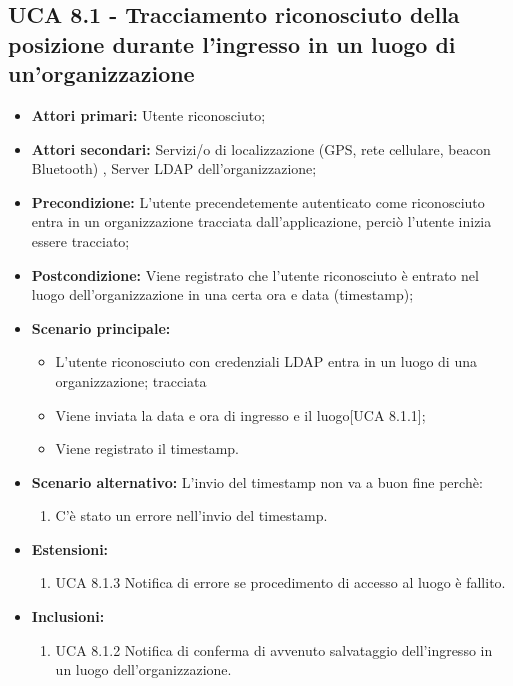\subsection{UCA 8.1 - Tracciamento riconosciuto della posizione durante l'ingresso in un luogo di un'organizzazione}%
\begin{itemize}
\item \textbf{Attori primari:} Utente riconosciuto;
\item \textbf{Attori secondari:} Servizi/o di localizzazione (GPS, rete cellulare, beacon Bluetooth) , Server LDAP dell'organizzazione;
\item \textbf{Precondizione:} L'utente precendetemente autenticato come riconosciuto entra in un organizzazione tracciata dall'applicazione, perciò l'utente inizia essere tracciato;
\item \textbf{Postcondizione:} Viene registrato che l'utente riconosciuto è entrato nel luogo dell'organizzazione in una certa ora e data (timestamp);
\item \textbf{Scenario principale:}
	\begin{itemize}
	\item L'utente riconosciuto con credenziali LDAP entra in un luogo di una organizzazione; tracciata
	\item Viene inviata la data e ora di ingresso e il luogo[UCA 8.1.1];
	\item Viene registrato il timestamp.
\end{itemize}
\item \textbf{Scenario alternativo:} L'invio del timestamp non va a buon fine perchè:
\begin{enumerate}
	\item C'è stato un errore nell'invio del timestamp.
\end{enumerate}
\item \textbf{Estensioni:}
	\begin{enumerate}
		\item UCA 8.1.3 Notifica di errore se procedimento di accesso al luogo è fallito.
	\end{enumerate}
\item \textbf{Inclusioni:}
\begin{enumerate}
	\item UCA 8.1.2 Notifica di conferma di avvenuto salvataggio dell'ingresso in un luogo dell'organizzazione.
\end{enumerate}
\end{itemize}

